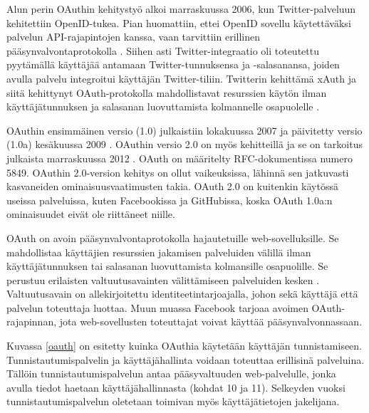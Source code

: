 Alun perin OAuthin kehitystyö alkoi marraskuussa 2006, kun Twitter-pal\-ve\-luun kehitettiin OpenID-tukea. Pian huomattiin, ettei OpenID sovellu käytettäväksi palvelun API-rajapintojen kanssa, vaan tarvittiin erillinen pääsynvalvontaprotokolla \cite{oauth_primer}. Siihen asti Twitter-integraatio oli toteutettu pyytämällä käyttäjää antamaan Twitter-tunnuksensa ja -salasanansa, joiden avulla palvelu integroitui käyttäjän Twitter-tiliin. Twitterin kehittämä xAuth ja siitä kehittynyt OAuth-protokolla mahdollistavat resurssien käytön ilman käyttäjätunnuksen ja salasanan luovuttamista kolmannelle osapuolelle \cite{oauth2_0}.

OAuthin ensimmäinen versio (1.0) julkaistiin lokakuussa 2007 ja päivitetty versio (1.0a) kesäkuussa 2009 \cite{oauth2_0}. OAuthin versio 2.0 on myös kehitteillä ja se on tarkoitus julkaista marraskuussa 2012 \cite{oauth2_0}. OAuth on määritelty RFC-dokumentissa numero 5849. OAuthin 2.0-version kehitys on ollut vaikeuksissa, lähinnä sen jatkuvasti kasvaneiden ominaisuusvaatimusten takia. OAuth 2.0 on kuitenkin käytössä useissa palveluissa, kuten Facebookissa ja GitHubissa, koska OAuth 1.0a:n ominaisuudet eivät ole riittäneet niille.

OAuth on avoin pääsynvalvontaprotokolla hajautetuille web-sovelluksille. Se mahdollistaa käyttäjien resurssien jakamisen palveluiden välillä ilman käyttäjätunnuksen tai salasanan luovuttamista kolmansille osapuolille. Se perustuu erilaisten valtuutusavainten välittämiseen palveluiden kesken \cite{oauth2_0}. Valtuutusavain on allekirjoitettu identiteetintarjoajalla, johon sekä käyttäjä että palvelun toteuttaja luottaa. Muun muassa Facebook tarjoaa avoimen OAuth-rajapinnan, jota web-sovellusten toteuttajat voivat käyttää pääsynvalvonnassaan.

Kuvassa \ref{oauth} on esitetty kuinka OAuthia käytetään käyttäjän tunnistamiseen. Tunnistautumispalvelin ja käyttäjähallinta voidaan toteuttaa erillisinä palveluina. Tällöin tunnistautumispalvelun antaa pääsyvaltuuden web-palvelulle, jonka avulla tiedot haetaan käyttäjähallinnasta (kohdat 10 ja 11). Selkeyden vuoksi tunnistautumispalvelun oletetaan toimivan myös käyttäjätietojen jakelijana.

